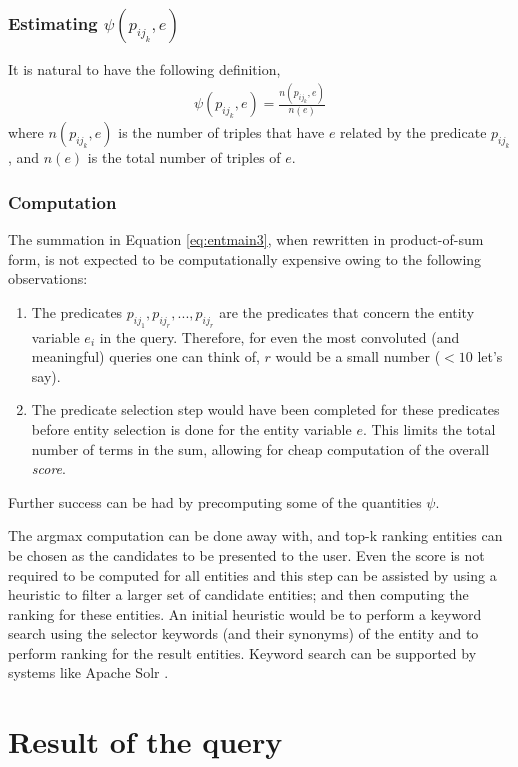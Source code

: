 \documentclass[a4paper, twoside, 12pt]{report}
\begin{document}
\subsubsection{Estimating $\psi(p_{ij_{k}}, e)$}
It is natural to have the following definition,
\begin{align}
\psi(p_{ij_{k}}, e) = \frac{n(p_{ij_{k}}, e)}{n(e)}
\end{align}
where $n(p_{ij_{k}}, e)$ is the number of triples that have $e$ related by the predicate $p_{ij_{k}}$, and $n(e)$ is the total number of triples of $e$.

\subsubsection{Computation}
The summation in Equation \ref{eq:entmain3}, when rewritten in product-of-sum form, is not expected to be computationally expensive owing to the following observations: 
\begin{enumerate}
  \item The predicates $p_{ij_1}, p_{ij_r}, ..., p_{ij_r}$ are the predicates that concern the entity variable $e_i$ in the query. Therefore, for even the most convoluted (and meaningful) queries one can think of, $r$ would be a small number ($< 10$ let's say).
  \item The predicate selection step would have been completed for these predicates before entity selection is done for the entity variable $e$. This limits the total number of terms in the sum, allowing for cheap computation of the overall \emph{score}.   
\end{enumerate}

Further success can be had by precomputing some of the quantities $\psi$. 

The argmax computation can be done away with, and top-k ranking entities can be chosen as the candidates to be presented to the user. Even the score is not required to be computed for all entities and this step can be assisted by using a heuristic to filter a larger set of candidate entities; and then computing the ranking for these entities. An initial heuristic would be to perform a keyword search using the selector keywords (and their synonyms) of the entity and to perform ranking for the result entities. Keyword search can be supported by systems like Apache Solr \cite{smiley2015apache}.

\section{Result of the query}
\end{document}
